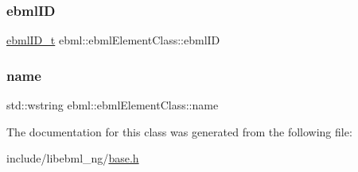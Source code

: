 \subsubsection{\texorpdfstring{ebml\+ID}{ebmlID}}
{\footnotesize\ttfamily \mbox{\hyperlink{namespaceebml_a86c5f604ddf12a74aa9812e997a58691}{ebml\+I\+D\+\_\+t}} ebml\+::ebml\+Element\+Class\+::ebml\+ID}

\mbox{\label{classebml_1_1ebmlElementClass_aba4096c056179fb989da05d86f4cb46d}} 
\subsubsection{\texorpdfstring{name}{name}}
{\footnotesize\ttfamily std\+::wstring ebml\+::ebml\+Element\+Class\+::name}



The documentation for this class was generated from the following file\+:\begin{DoxyCompactItemize}
\item 
include/libebml\+\_\+ng/\mbox{\hyperlink{base_8h}{base.\+h}}\end{DoxyCompactItemize}

